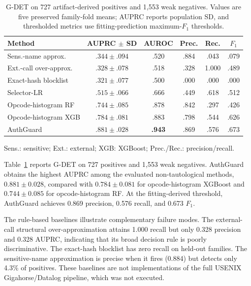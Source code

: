 \documentclass[conference]{IEEEtran}
\begin{document}
\begin{table}[t]
  \centering
  \caption{G-DET on 727 artifact-derived positives and 1,553 weak negatives. Values are five preserved family-fold means; AUPRC reports population SD, and thresholded metrics use fitting-prediction maximum-$F_1$ thresholds.}
  \label{tab:gdet-performance}
  \scriptsize
  \setlength{\tabcolsep}{2.0pt}
  \begin{tabular}{@{}lccccc@{}}
    \toprule
    Method & \shortstack{AUPRC\\$\pm$ SD} & AUROC & Prec. & Rec. & $F_1$ \\
    \midrule
    Sens.-name approx. & $.344\pm.094$ & .520 & .884 & .043 & .079 \\
    Ext.-call over-approx. & $.328\pm.078$ & .518 & .328 & 1.000 & .489 \\
    Exact-hash blocklist & $.321\pm.077$ & .500 & .000 & .000 & .000 \\
    Selector-LR & $.515\pm.066$ & .666 & .449 & .618 & .512 \\
    Opcode-histogram RF & $.744\pm.085$ & .878 & .842 & .297 & .426 \\
    Opcode-histogram XGB & $.784\pm.081$ & .883 & .798 & .544 & .626 \\
    AuthGuard & $\mathbf{.881\pm.028}$ & \textbf{.943} & .869 & .576 & .673 \\
    \bottomrule
  \end{tabular}
  \vspace{1pt}

  \parbox{\columnwidth}{\scriptsize Sens.: sensitive; Ext.: external; XGB: XGBoost; Prec./Rec.: precision/recall.}
\end{table}

Table~\ref{tab:gdet-performance} reports G-DET on 727 positives and 1,553 weak negatives. AuthGuard obtains the highest AUPRC among the evaluated non-tautological methods, $0.881\pm0.028$, compared with $0.784\pm0.081$ for opcode-histogram XGBoost and $0.744\pm0.085$ for opcode-histogram RF. At the fitting-derived threshold, AuthGuard achieves 0.869 precision, 0.576 recall, and 0.673 $F_1$.

The rule-based baselines illustrate complementary failure modes. The external-call structural over-approximation attains 1.000 recall but only 0.328 precision and 0.328 AUPRC, indicating that its broad decision rule is poorly discriminative. The exact-hash blocklist has zero recall on held-out families. The sensitive-name approximation is precise when it fires (0.884) but detects only 4.3\% of positives. These baselines are not implementations of the full USENIX Gigahorse/Datalog pipeline, which was not executed.
\end{document}
